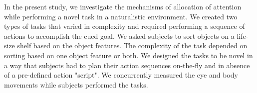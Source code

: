 In the present study, we investigate the mechanisms of allocation of attention while performing a novel task in a naturalistic environment. We created two types of tasks that varied in complexity and required performing a sequence of actions to accomplish the cued goal. We asked subjects to sort objects on a life-size shelf based on the object features. The complexity of the task depended on sorting based on one object feature or both. We designed the tasks to be novel in a way that subjects had to plan their action sequences on-the-fly and in absence of a pre-defined action "script". We concurrently measured the eye and body movements while subjects performed the tasks. 





